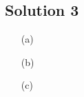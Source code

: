 \subsection*{Solution 3}

\begin{itemize}
\item[(a)]
\todo
\item[(b)]
\todo
\item[(c)]
\todo
\end{itemize}

